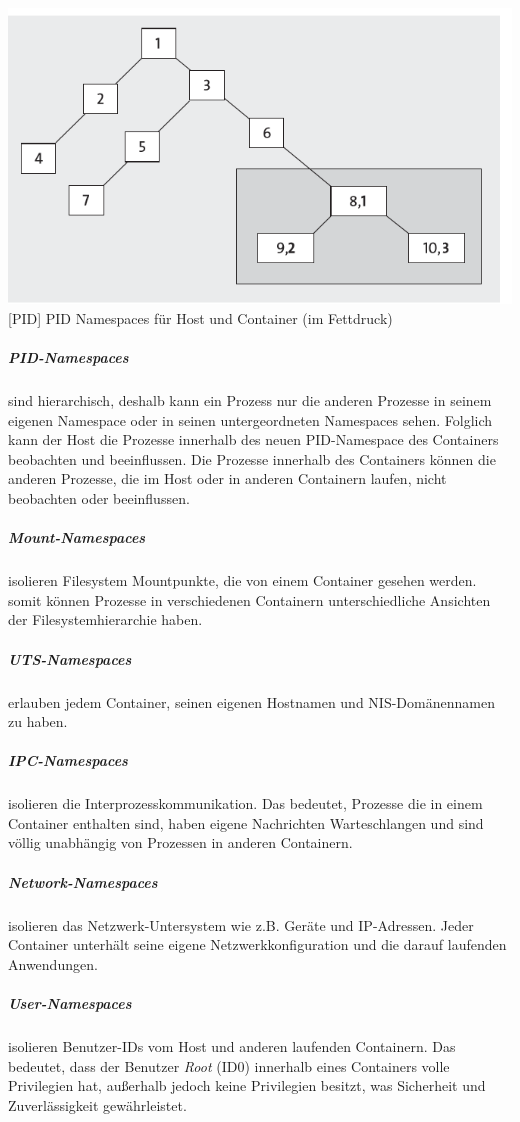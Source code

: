\vspace{1em}
\begin{minipage}{\linewidth}
	\centering
	\includegraphics[width=1\linewidth]{pics/PID.PNG}
	[PID]{ PID Namespaces für Host und Container (im Fettdruck) \cite{Liebel2017SkalierbareContainer-Infrastrukturen}}
	\label{fig:PID}
\end{minipage}

\subparagraph{PID-Namespaces} sind hierarchisch, deshalb kann ein Prozess nur die anderen Prozesse in seinem eigenen Namespace oder in seinen untergeordneten Namespaces sehen. Folglich kann der Host die Prozesse innerhalb des neuen PID-Namespace des Containers beobachten und beeinflussen. Die Prozesse innerhalb des Containers können die anderen Prozesse, die im Host oder in anderen Containern laufen, nicht beobachten oder beeinflussen.

\subparagraph{Mount-Namespaces} isolieren Filesystem Mountpunkte, die von einem Container gesehen werden. somit können Prozesse in verschiedenen Containern unterschiedliche Ansichten der Filesystemhierarchie haben.

\subparagraph{UTS-Namespaces} erlauben jedem Container, seinen eigenen Hostnamen und NIS-Domänennamen zu haben.

\subparagraph{IPC-Namespaces} isolieren die Interprozesskommunikation. Das bedeutet, Prozesse die in einem Container enthalten sind, haben eigene Nachrichten Warteschlangen und sind völlig unabhängig von Prozessen in anderen Containern.

\subparagraph{Network-Namespaces} isolieren das Netzwerk-Untersystem wie z.B. Geräte und IP-Adressen. Jeder Container unterhält seine eigene Netzwerkkonfiguration und die darauf laufenden Anwendungen.

\subparagraph{User-Namespaces} isolieren Benutzer-IDs vom Host und anderen laufenden Containern. Das bedeutet, dass der Benutzer \emph{Root} (ID0) innerhalb eines Containers volle Privilegien hat, außerhalb jedoch keine Privilegien besitzt, was Sicherheit und Zuverlässigkeit gewährleistet. \cite{Xavier2015AClouds}

